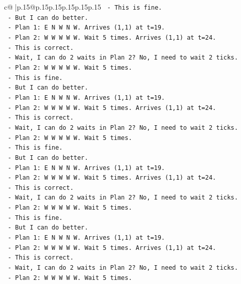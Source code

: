 \documentclass{article}
\begin{document}
{\begin{supertabular}{c@{$\;$}|p{.15\linewidth}@{}p{.15\linewidth}p{.15\linewidth}p{.15\linewidth}p{.15\linewidth}p{.15\linewidth}}
{{{\texttt{   {-} This is fine.} \\
\texttt{   {-} But I can do better.} \\
\texttt{   {-} Plan 1: E N W N W. Arrives (1,1) at t=19.} \\
\texttt{   {-} Plan 2: W W W W W. Wait 5 times. Arrives (1,1) at t=24.} \\
\texttt{   {-} This is correct.} \\
\texttt{   {-} Wait, I can do 2 waits in Plan 2? No, I need to wait 2 ticks.} \\
\texttt{   {-} Plan 2: W W W W W. Wait 5 times.} \\
\texttt{   {-} This is fine.} \\
\texttt{   {-} But I can do better.} \\
\texttt{   {-} Plan 1: E N W N W. Arrives (1,1) at t=19.} \\
\texttt{   {-} Plan 2: W W W W W. Wait 5 times. Arrives (1,1) at t=24.} \\
\texttt{   {-} This is correct.} \\
\texttt{   {-} Wait, I can do 2 waits in Plan 2? No, I need to wait 2 ticks.} \\
\texttt{   {-} Plan 2: W W W W W. Wait 5 times.} \\
\texttt{   {-} This is fine.} \\
\texttt{   {-} But I can do better.} \\
\texttt{   {-} Plan 1: E N W N W. Arrives (1,1) at t=19.} \\
\texttt{   {-} Plan 2: W W W W W. Wait 5 times. Arrives (1,1) at t=24.} \\
\texttt{   {-} This is correct.} \\
\texttt{   {-} Wait, I can do 2 waits in Plan 2? No, I need to wait 2 ticks.} \\
\texttt{   {-} Plan 2: W W W W W. Wait 5 times.} \\
\texttt{   {-} This is fine.} \\
\texttt{   {-} But I can do better.} \\
\texttt{   {-} Plan 1: E N W N W. Arrives (1,1) at t=19.} \\
\texttt{   {-} Plan 2: W W W W W. Wait 5 times. Arrives (1,1) at t=24.} \\
\texttt{   {-} This is correct.} \\
\texttt{   {-} Wait, I can do 2 waits in Plan 2? No, I need to wait 2 ticks.} \\
\texttt{   {-} Plan 2: W W W W W. Wait 5 times.} \\
}}}
\end{supertabular}}
\end{document}
